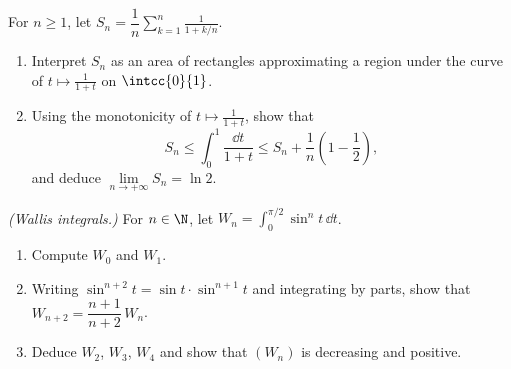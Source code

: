 \begin{exercise}[$\star\star\star$]\label{exo:tle:integ:8}
For $n \geq 1$, let $S_n = \dfrac1n \displaystyle\sum_{k=1}^{n} \frac{1}{1 + k/n}$.
\begin{enumerate}
  \item Interpret $S_n$ as an area of rectangles approximating a region
        under the curve of $t \mapsto \frac{1}{1+t}$ on $\intcc{0}{1}$.
  \item Using the monotonicity of $t \mapsto \frac{1}{1+t}$, show that
        \[
        S_n \leq \int_0^1 \frac{\dd t}{1+t} \leq S_n + \frac1n\left(1 - \frac12\right),
        \]
        and deduce $\lim\limits_{n\to+\infty} S_n = \ln 2$.
\end{enumerate}
\end{exercise}

\begin{exercise}[$\star\star\star$]\label{exo:tle:integ:9}
\emph{(Wallis integrals.)} For $n \in \N$, let
$W_n = \displaystyle\int_0^{\pi/2} \sin^n t\,\dd t$.
\begin{enumerate}
  \item Compute $W_0$ and $W_1$.
  \item Writing $\sin^{n+2}t = \sin t \cdot \sin^{n+1} t$ and integrating by
        parts, show that $W_{n+2} = \dfrac{n+1}{n+2}\,W_n$.
  \item Deduce $W_2$, $W_3$, $W_4$ and show that $(W_n)$ is decreasing and
        positive.
\end{enumerate}
\end{exercise}
